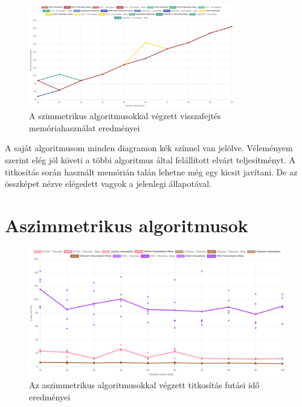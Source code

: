 \documentclass[12pt]{report} %
\begin{document}
\begin{figure}[H]
    \centering %
    \includegraphics[width=0.8\textwidth]{Figures/SymmetricDecryptionMemoryUsage.png} %
    \caption{A szimmetrikus algoritmusokkal végzett visszafejtés memóriahasználat eredményei} %
    \label{fig:SymmetricDecryptionMemoryUsage} %
\end{figure}

A saját algoritmusom minden diagramon kék színnel van jelölve. Véleményem szerint elég jól követi a többi algoritmus által felállított elvárt teljesítményt. A titkosítás során használt memórián talán lehetne még egy kicsit javítani. De az összképet nézve elégedett vagyok a jelenlegi állapotával.

\section{Aszimmetrikus algoritmusok} %

\begin{figure}[H]
    \centering %
    \includegraphics[width=\textwidth]{Figures/AsymmetricEncryptionRunTime.png} %
    \caption{Az aszimmetrikus algoritmusokkal végzett titkosítás futási idő eredményei} %
    \label{fig:AsymmetricEncryptionRunTime} %
\end{figure}
\end{document}
